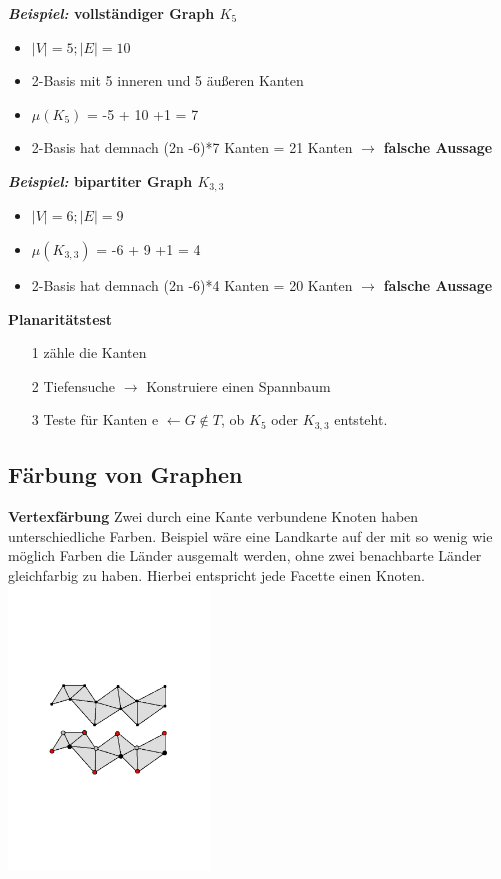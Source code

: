 \textbf{\textit{Beispiel:} vollständiger Graph $K_5$} \newline
\begin{itemize}
	\item $|V| = 5 ; |E| = 10$
	\item 2-Basis mit 5 inneren und 5 äußeren Kanten
	\item $\mu(K_5)$ = -5 + 10 +1 = 7
	\item 2-Basis hat demnach (2n -6)*7 Kanten = 21 Kanten $\rightarrow$ \newline \textbf{falsche Aussage}
\end{itemize}	
\textbf{\textit{Beispiel:} bipartiter Graph $K_{3,3}$} \newline
\begin{itemize}
	\item $|V| = 6 ; |E| = 9$
	\item $\mu(K_{3,3})$ = -6 + 9 +1 = 4
	\item 2-Basis hat demnach (2n -6)*4 Kanten = 20 Kanten $\rightarrow$ \newline \textbf{falsche Aussage}
\end{itemize}
\textbf{Planaritätstest}
\begin{itemize}
	\item[1] zähle die Kanten 
	\item[2] Tiefensuche $\rightarrow$ Konstruiere einen Spannbaum
	\item[3] Teste für Kanten e $\leftarrow G \notin T$, ob $K_5$ oder $K_{3,3}$ entsteht.
\end{itemize}

\subsection{Färbung von Graphen}
\textbf{Vertexfärbung}\newline
Zwei durch eine Kante verbundene Knoten haben unterschiedliche Farben. \newline
Beispiel wäre eine Landkarte auf der mit so wenig wie möglich Farben die Länder ausgemalt werden, ohne zwei benachbarte Länder gleichfarbig zu haben. Hierbei entspricht jede Facette einen Knoten.\newline
\includegraphics[width=0.4\textwidth]{lectures/161118/pix/Vertexfaerbung}